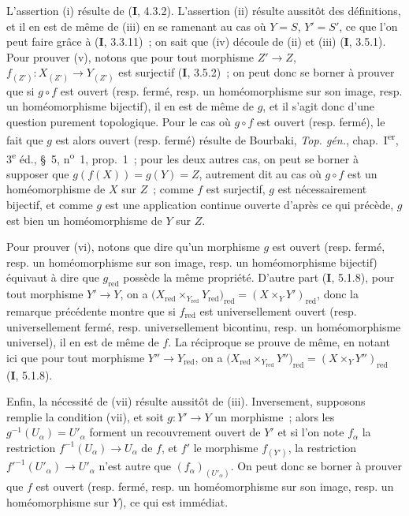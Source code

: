 L'assertion (i) résulte de (\textbf{I}, 4.3.2). L'assertion (ii) résulte aussitôt des
définitions, et il en est de même de (iii) en se ramenant au cas où $Y=S$,
$Y'=S'$, ce que l'on peut faire grâce à (\textbf{I}, 3.3.11)~; on sait que (iv)
découle de (ii) et (iii) (\textbf{I}, 3.5.1). Pour prouver (v), notons que pour tout
morphisme $Z'\to Z$, $f_{(Z')}:X_{(Z')}\to Y_{(Z')}$ est surjectif
(\textbf{I}, 3.5.2)~; on peut donc se borner à prouver que si $g\circ f$ est ouvert
(resp. fermé, resp. un
homéomorphisme sur son image, resp. un homéomorphisme bijectif), il en est de
même de $g$, et il s'agit donc d'une question purement topologique. Pour le
cas où $g\circ f$ est ouvert (resp. fermé), le fait que $g$ est alors ouvert
(resp. fermé) résulte de Bourbaki, \emph{Top. gén.}, chap.~I\textsuperscript{er},
3\textsuperscript{e} éd., \S~5, n\textsuperscript{o}~1, prop.~1~; pour les
deux autres cas, on peut se borner à supposer que
$g(f(X))=g(Y)=Z$, autrement dit au cas où $g\circ f$ est un homéomorphisme de
$X$ sur $Z$~; comme $f$ est surjectif, $g$ est nécessairement bijectif, et
comme $g$ est une application continue ouverte d'après ce qui précède, $g$
est bien un homéomorphisme de $Y$ sur $Z$.

Pour prouver (vi), notons que dire qu'un morphisme $g$ est ouvert (resp.
fermé, resp. un homéomorphisme sur son image, resp. un homéomorphisme
bijectif) équivaut à dire que $g_{\mathrm{red}}$ possède la même propriété.
D'autre part (\textbf{I}, 5.1.8), pour tout morphisme $Y'\to Y$, on a
$\bigl(X_{\mathrm{red}}\times_{Y_{\mathrm{red}}}Y_{\mathrm{red}}\bigr)_{\mathrm{red}}
=(X\times_Y Y')_{\mathrm{red}}$,
donc la remarque précédente montre que si $f_{\mathrm{red}}$ est
universellement ouvert (resp. universellement fermé, resp. universellement
bicontinu, resp. un homéomorphisme universel), il en est de même de $f$. La
réciproque se prouve de même, en notant ici que pour tout morphisme
$Y''\to Y_{\mathrm{red}}$, on a
$\bigl(X_{\mathrm{red}}\times_{Y_{\mathrm{red}}}Y''\bigr)_{\mathrm{red}}
=(X\times_Y Y'')_{\mathrm{red}}$
(\textbf{I}, 5.1.8).

Enfin, la nécessité de (vii) résulte aussitôt de (iii). Inversement, supposons
remplie la condition (vii), et soit $g:Y'\to Y$ un morphisme~; alors les
$g^{-1}(U_\alpha)=U'_\alpha$ forment un recouvrement ouvert de $Y'$ et si
l'on note $f_\alpha$ la restriction $f^{-1}(U_\alpha)\to U_\alpha$ de $f$,
et $f'$ le morphisme $f_{(Y')}$, la restriction
$f'^{-1}(U'_\alpha)\to U'_\alpha$ n'est autre que
$(f_\alpha)_{(U'_\alpha)}$. On peut donc se borner à prouver que $f$ est
ouvert (resp. fermé, resp. un homéomorphisme sur son image, resp. un
homéomorphisme sur $Y$), ce qui est immédiat.

